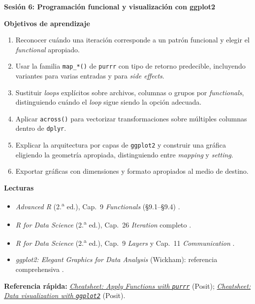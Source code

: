 \documentclass[11pt,letterpaper]{article}
\newcommand{\sesion}[2]{%
  \bigskip%
  {\color{main}\Large\bfseries Sesión #1: #2\par}%
  \smallskip%
}
\newcommand{\cheatsheet}[2]{%
  \href{https://rstudio.github.io/cheatsheets/#1.pdf}{\textit{Cheatsheet: #2}}%
}
\begin{document}
\sesion{6}{Programación funcional y visualización con ggplot2}
\medskip
\noindent\textbf{Objetivos de aprendizaje}
\begin{enumerate}[leftmargin=*, itemsep=1pt]
    \item Reconocer cuándo una iteración corresponde a un patrón funcional y elegir el \textit{functional} apropiado.
    \item Usar la familia \texttt{map\_*()} de \texttt{purrr} con tipo de retorno predecible, incluyendo variantes para varias entradas y para \textit{side effects}.
    \item Sustituir \textit{loops} explícitos sobre archivos, columnas o grupos por \textit{functionals}, distinguiendo cuándo el \textit{loop} sigue siendo la opción adecuada.
    \item Aplicar \texttt{across()} para vectorizar transformaciones sobre múltiples columnas dentro de \texttt{dplyr}.
    \item Explicar la arquitectura por capas de \texttt{ggplot2} y construir una gráfica eligiendo la geometría apropiada, distinguiendo entre \textit{mapping} y \textit{setting}.
    \item Exportar gráficas con dimensiones y formato apropiados al medio de destino.
\end{enumerate}

\medskip
\noindent\textbf{Lecturas}
\begin{itemize}[leftmargin=*, itemsep=1pt]
    \item \textit{Advanced R} (2.\textsuperscript{a} ed.), Cap.\ 9 \textit{Functionals} (§9.1--§9.4) \cite{wickham2019advr}.
    \item \textit{R for Data Science} (2.\textsuperscript{a} ed.), Cap.\ 26 \textit{Iteration} completo \cite{wickham2023r4ds}.
    \item \textit{R for Data Science} (2.\textsuperscript{a} ed.), Cap.\ 9 \textit{Layers} y Cap.\ 11 \textit{Communication} \cite{wickham2023r4ds}.
    \item \textit{ggplot2: Elegant Graphics for Data Analysis} (Wickham): referencia comprehensiva \cite{wickham2016ggplot2}.
\end{itemize}

\medskip
\noindent\textbf{Referencia rápida:} \cheatsheet{purrr}{Apply Functions with \texttt{purrr}} (Posit); \cheatsheet{data-visualization}{Data visualization with \texttt{ggplot2}} (Posit).

\end{document}
